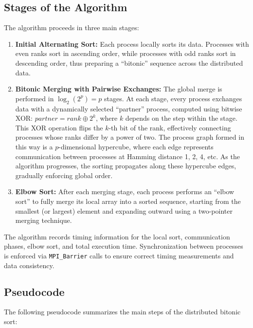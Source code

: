 \documentclass{article}
\begin{document}
\subsection{Stages of the Algorithm}
The algorithm proceeds in three main stages:
\begin{enumerate}
    \item \textbf{Initial Alternating Sort:}  
    Each process locally sorts its data. Processes with even ranks sort in ascending order, while processes 
    with odd ranks sort in descending order, thus preparing a ``bitonic'' sequence across the distributed data.
    
    \item \textbf{Bitonic Merging with Pairwise Exchanges:}  
    The global merge is performed in $\log_2 (2^p) = p$ stages. At each stage, every process exchanges data 
    with a dynamically selected ``partner'' process, computed using bitwise XOR: $partner = rank \oplus 2^k$, 
    where $k$ depends on the step within the stage. This XOR operation flips the $k$-th bit of the rank, 
    effectively connecting processes whose ranks differ by a power of two. The process graph formed in this way 
    is a $p$-dimensional hypercube, where each edge represents communication between processes at Hamming 
    distance 1, 2, 4, etc. As the algorithm progresses, the sorting propagates along these hypercube edges, 
    gradually enforcing global order.

    \item \textbf{Elbow Sort:}  
    After each merging stage, each process performs an ``elbow sort'' to fully merge its local array into 
    a sorted sequence, starting from the smallest (or largest) element and expanding outward using a two-pointer
    merging technique.
\end{enumerate}

The algorithm records timing information for the local sort, communication phases, elbow sort, and total
execution time. Synchronization between processes is enforced via \texttt{MPI\_Barrier} calls to ensure 
correct timing measurements and data consistency.

\subsection{Pseudocode}

The following pseudocode summarizes the main steps of the distributed bitonic sort:
\end{document}
